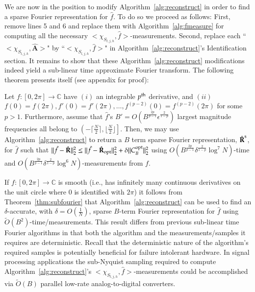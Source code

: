 \documentclass{article}
\begin{document}
We are now in the position to modify Algorithm~\ref{alg:reconstruct} in order to find a sparse Fourier representation for $\hat{f}$.  To do so we proceed as follows:  First, remove lines 5 and 6 and replace them with Algorithm~\ref{alg:fmeasure} for computing all the necessary $<\chi_{S_{l,j,h}}, \hat{f}>$-measurements.  Second, replace each ``$<\chi_{S_{l,j,h}}, \hat{\textbf{A}}>$" by ``$<\chi_{S_{l,j,h}}, \hat{f}>$" in Algorithm~\ref{alg:reconstruct}'s {\sc Identification} section.  It remains to show that these Algorithm~\ref{alg:reconstruct} modifications indeed yield a sub-linear time approximate Fourier transform.  The following theorem presents itself (see appendix for proof):

\begin{Theorem}
Let $f: [0,2 \pi] \rightarrow \mathbb{C}$ have $(i)$ an integrable $p^{\rm th}$ derivative, and $(ii)$ $f(0) = f(2 \pi), f'(0) = f'(2 \pi), \dots, f^{(p-2)}(0) = f^{(p-2)}(2 \pi)$ for some $p > 1$.  Furthermore, assume that $\hat{f}$'s $B' = O \left( B^{\frac{2p}{p-1}} \epsilon^{\frac{2}{1-p}} \right)$ largest magnitude frequencies all belong to $\left( - \big\lceil \frac{N}{2} \big\rceil, \big\lfloor \frac{N}{2} \big\rfloor \right]$.  Then, we may use Algorithm~\ref{alg:reconstruct} to return a $B$ term sparse Fourier representation, $\hat{\textbf{R}}^{\rm s}$, for $\hat{f}$ such that $\| \hat{f} - \hat{\textbf{R}} \|^{2}_{2} \leq \| \hat{f} - \hat{\textbf{R}}_{\rm opt} \|^{2}_{2} + \delta \| C^{\rm opt}_{B} \|^{2}_{2}$ using $O \left( B^{\frac{2p}{p-1}} \delta^{\frac{2}{1-p}} \log^{7} N \right)$-time and $O \left( B^{\frac{2p}{p-1}} \delta^{\frac{2}{1-p}} \log^{6} N \right)$-measurements from $f$.
\label{thm:subfourier}
\end{Theorem}

If $f: [0,2 \pi] \rightarrow \mathbb{C}$ is smooth (i.e., has infinitely many continuous derivatives on the unit circle where 0 is identified with $2 \pi$) it follows from Theorem~\ref{thm:subfourier} that Algorithm~\ref{alg:reconstruct} can be used to find an $\delta$-accurate, with $\delta = O \left( \frac{1}{N} \right)$, sparse $B$-term Fourier representation for $\hat{f}$ using $\tilde{O}(B^{2})$-time/measurements.  This result differs from previous sub-linear time Fourier algorithms \cite{AAFFT1,AAFFT2} in that both the algorithm and the measurements/samples it requires are deterministic.  Recall that the deterministic nature of the algorithm's required samples is potentially beneficial for failure intolerant hardware.  In signal processing applications the sub-Nyquist sampling required to compute Algorithm~\ref{alg:reconstruct}'s $<\chi_{S_{l,j,h}}, \hat{f}>$-measurements could be accomplished via $\tilde{O}(B)$ parallel low-rate analog-to-digital converters.
\end{document}
